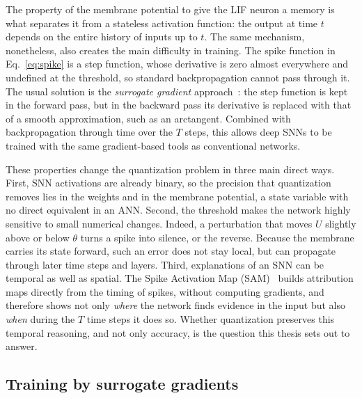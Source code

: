 The property of the membrane potential to give the LIF neuron a memory is what separates
it from a stateless activation function: the output at time $t$ depends on the
entire history of inputs up to $t$.
The same mechanism, nonetheless, also creates the main
difficulty in training. The spike function in Eq.~\eqref{eq:spike} is a step
function, whose derivative is zero almost everywhere and undefined at the
threshold, so standard backpropagation cannot pass through it. The usual solution
is the \emph{surrogate gradient} approach~\cite{neftci2019surrogate}: the step
function is kept in the forward pass, but in the backward pass its
derivative is replaced with that of a smooth approximation, such as an arctangent.
Combined with backpropagation through time over the $T$ steps, this allows deep SNNs to
be trained with the same gradient-based tools as conventional networks.

These properties change the quantization problem in three main direct ways. First, SNN
activations are already binary, so the precision that quantization removes lies
in the weights and in the membrane potential, a state variable with no direct
equivalent in an ANN. Second, the threshold makes the network highly sensitive to
small numerical changes. Indeed, a perturbation that moves $U$ slightly above or below
$\theta$ turns a spike into silence, or the reverse. Because the membrane carries
its state forward, such an error does not stay local, but can propagate through
later time steps and layers. Third, explanations of an SNN can be temporal as well
as spatial. The Spike Activation Map (SAM)~\cite{kim2021sam} builds
attribution maps directly from the timing of spikes, without computing
gradients, and therefore shows not only \emph{where} the network finds evidence in
the input but also \emph{when} during the $T$ time steps it does so. Whether
quantization preserves this temporal reasoning, and not only accuracy, is the
question this thesis sets out to answer.

\subsection{Training by surrogate gradients}
\label{sec:surrogate}

